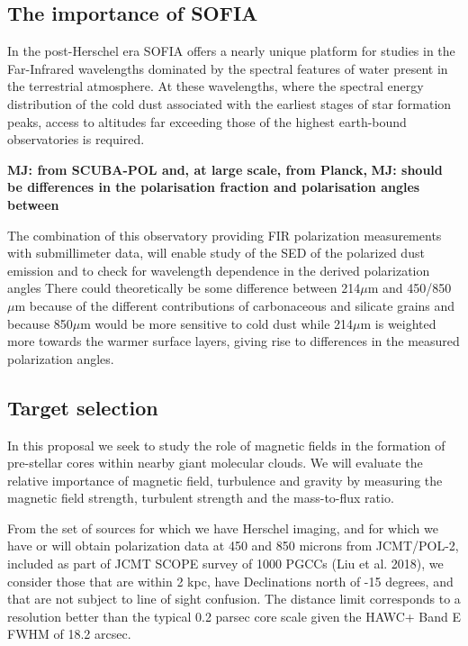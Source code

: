 \documentclass[11pt]{amsart}
\begin{document}
{\subsection{The importance of SOFIA}

In the post-Herschel era SOFIA offers a nearly unique platform for studies in the Far-Infrared
wavelengths dominated by the spectral features of water present in the terrestrial atmosphere.
At these wavelengths, where the spectral energy distribution of the cold dust associated 
with the earliest stages of star formation peaks, access to altitudes far exceeding those of the
highest earth-bound observatories is required. 

{\bf MJ: from SCUBA-POL and, at large scale, from Planck,}
{\bf MJ: should be differences in the polarisation fraction and polarisation angles between}

The combination of this observatory providing FIR polarization measurements
with submillimeter data, will enable study of the SED of the polarized dust emission and to check for wavelength dependence in the derived polarization angles
There could theoretically be some difference between 214$\mu$m and 450/850 $\mu$m because of the different contributions of carbonaceous and silicate grains  and because 850$\mu$m would be more sensitive to cold dust while 214$\mu$m is weighted more towards the warmer surface layers, giving rise to differences in the measured polarization angles.

 
\subsection{Target selection}

In this proposal we seek to study the role of magnetic fields in the formation of pre-stellar cores within 
nearby giant molecular clouds.
We will evaluate the relative importance of magnetic field, turbulence and gravity by measuring the magnetic field strength, turbulent strength and the mass-to-flux ratio.

From the set of sources for which we have Herschel imaging, and for which we have or will obtain polarization data at  450 and 850 microns from JCMT/POL-2, included as part of JCMT SCOPE survey of 1000 PGCCs (Liu et al. 2018), we consider those that are within 2 kpc, have Declinations north of -15 degrees, and that are not subject to line of sight confusion. The distance limit corresponds to a resolution better than the typical 0.2 parsec core scale given the HAWC+ Band E FWHM of 18.2 arcsec. 

}
\end{document}
